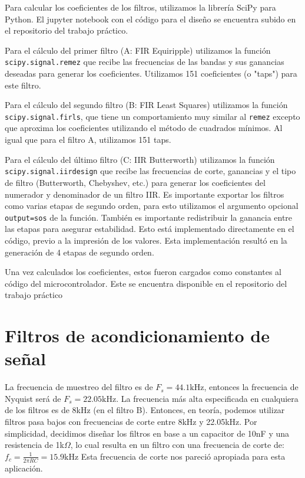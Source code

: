 \documentclass[11pt,a4paper]{report}
\begin{document}
Para calcular los coeficientes de los filtros, utilizamos la librería SciPy para Python. El jupyter notebook con el código para el diseño se encuentra subido en el repositorio del trabajo práctico. \cite{notebook_calculos}

\vspace{0.5cm}


Para el cálculo del primer filtro (A: FIR Equiripple) utilizamos la función \texttt{scipy.signal.remez} que recibe las frecuencias de las bandas y sus ganancias deseadas para generar los coeficientes.
Utilizamos 151 coeficientes (o "taps") para este filtro.

\vspace{0.5cm}

Para el cálculo del segundo filtro (B: FIR Least Squares) utilizamos la función \texttt{scipy.signal.firls}, que tiene un comportamiento muy similar al \texttt{remez} excepto que aproxima los coeficientes utilizando el método de cuadrados mínimos.
Al igual que para el filtro A, utilizamos 151 taps.

\vspace{0.5cm}

Para el cálculo del último filtro (C: IIR Butterworth) utilizamos la función \texttt{scipy.signal.iirdesign} que recibe las frecuencias de corte, ganancias y el tipo de filtro (Butterworth, Chebyshev, etc.) para generar los coeficientes del numerador y denominador de un filtro IIR.
Es importante exportar los filtros como varias etapas de segundo orden, para esto utilizamos el argumento opcional \texttt{output=sos} de la función. También es importante redistribuir la ganancia entre las etapas para asegurar estabilidad. Esto está implementado directamente en el código, previo a la impresión de los valores.
Esta implementación resultó en la generación de 4 etapas de segundo orden.

Una vez calculados los coeficientes, estos fueron cargados como constantes al código del microcontrolador. Este se encuentra disponible en el repositorio del trabajo práctico \cite{codigo}

\section{Filtros de acondicionamiento de señal}

La frecuencia de muestreo del filtro es de $F_s = 44.1 \mathrm{kHz}$, entonces la frecuencia de Nyquist será de $F_s = 22.05 \mathrm{kHz}$. La frecuencia más alta especificada en cualquiera de los filtros es de 8kHz (en el filtro B). Entonces, en teoría, podemos utilizar filtros pasa bajos con frecuencias de corte entre 8kHz y 22.05kHz. Por simplicidad, decidimos diseñar los filtros en base a un capacitor de 10nF y una resistencia de 1k$\Omega$, lo cual resulta en un filtro con una frecuencia de corte de: $f_c = \frac{1}{2 \pi R C} = 15.9\mathrm{kHz}$ 
Esta frecuencia de corte nos pareció apropiada para esta aplicación.
\end{document}
